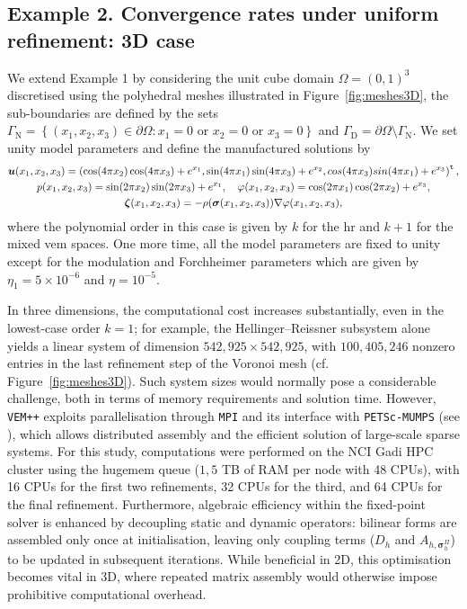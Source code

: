 \documentclass[fleqn,a4paper]{cas-sc}
\newcommand{\bu}{\boldsymbol{u}}
\newcommand{\bzeta}{\boldsymbol{\zeta}}
\newcommand{\0}{\boldsymbol{0}}
\newcommand\bsigma{\boldsymbol{\sigma}}
\numberwithin{equation}{section}
\numberwithin{figure}{section}
\begin{document}
\subsection{Example 2. Convergence rates under uniform refinement: 3D case} \label{sec:ex2}
We extend Example 1 by {considering} the unit cube domain $\Omega = (0,1)^3$ discretised using the polyhedral meshes illustrated in Figure~\ref{fig:meshes3D}, the sub-boundaries are defined by the sets $\Gamma_{\mathrm{N}} = \left\{ (x_1,x_2,x_3)\in \partial \Omega : x_1=0 \text{ or } x_2=0 \text{ or } x_3=0\right\}$ and $\Gamma_{\mathrm{D}} = \partial \Omega \setminus \Gamma_{\mathrm{N}}$. We set unity model parameters and define the manufactured solutions by
\begin{gather*}
  \bu(x_1,x_2,x_3) = \left( \cos(4\pi x_2)\cos(4\pi x_3) + e^{x_1}, \sin(4\pi x_1)\sin(4\pi x_3) + e^{x_2}, cos(4 \pi x_3)sin(4\pi x_1) + e^{x_3}\right)^{\tt t}, \\
  p(x_1,x_2,x_3) = \sin(2\pi x_2)\sin(2\pi x_3) + e^{x_1},\quad
  \varphi(x_1,x_2,x_3) = \cos(2\pi x_1)\cos(2\pi x_2) + e^{x_3}, \\  \bzeta(x_1,x_2,x_3) = -\rho(\bsigma(x_1,x_2,x_3))\nabla \varphi(x_1,x_2,x_3),
\end{gather*}
where the polynomial order in this case is given by $k$ for the \gls{hr} and $k+1$ for the mixed \gls{vem} spaces. One more time, all the model parameters are fixed to unity except for the modulation and Forchheimer parameters which are given by $\eta_1=5\times10^{-6}$ and $\eta=10^{-5}$.

In three dimensions, the computational cost increases substantially, even in the lowest-case order $k=1$; for example, the Hellinger–Reissner subsystem alone yields a linear system of dimension $542{,}925 \times 542{,}925$, with $100{,}405{,}246$ nonzero entries in the last refinement step of the Voronoi mesh (cf. Figure~\ref{fig:meshes3D}). Such system sizes would normally pose a considerable challenge, both in terms of memory requirements and solution time. However, \texttt{VEM++} exploits parallelisation through \texttt{MPI} and its interface with \texttt{PETSc-MUMPS} (see \cite{petsc2025}), which allows distributed assembly and the efficient solution of large-scale sparse systems. For this study, computations were performed on the NCI Gadi HPC cluster using the hugemem queue ($1{,}5$ TB of RAM per node with 48 CPUs), with 16 CPUs for the first two refinements, 32 CPUs for the third, and 64 CPUs for the final refinement. {Furthermore, algebraic efficiency within the fixed-point solver is enhanced by decoupling static and dynamic operators: bilinear forms are assembled only once at initialisation, leaving only coupling terms ($D_h$ and $A_{h,\boldsymbol{\sigma}_h^\Pi}$) to be updated in subsequent iterations. While beneficial in 2D, this optimisation becomes vital in 3D, where repeated matrix assembly would otherwise impose prohibitive computational overhead.}
\end{document}
